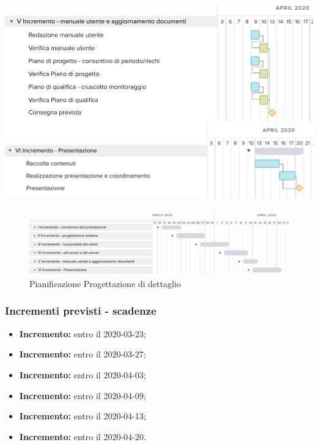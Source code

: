 	\includegraphics[width=\textwidth]{res/img/gantt/RQ/5}
	\includegraphics[width=\textwidth]{res/img/gantt/RQ/6}
\begin{figure}[h!]
	\includegraphics[width=\textwidth]{res/img/gantt/RQ/f}
	\caption{Pianificazione Progettazione di dettaglio}
\end{figure}
\subsubsection{Incrementi previsti - scadenze}
\begin{itemize}
	\item \textbf{ Incremento:} entro il 2020-03-23;
	\item \textbf{ Incremento:} entro il 2020-03-27;
	\item \textbf{ Incremento:} entro il 2020-04-03;
	\item \textbf{ Incremento:} entro il 2020-04-09;
	\item \textbf{ Incremento:} entro il 2020-04-13;
	\item \textbf{ Incremento:} entro il 2020-04-20.
\end{itemize}
